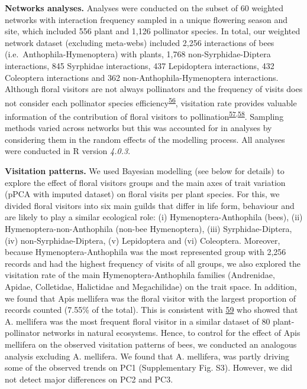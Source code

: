 \documentclass[12pt,a4paper,]{article}
\begin{document}
\textbf{Networks analyses.} Analyses were conducted on the subset of 60
weighted networks with interaction frequency sampled in a unique
flowering season and site, which included 556 plant and 1,126 pollinator
species. In total, our weighted network dataset (excluding meta-webs)
included 2,256 interactions of bees (i.e.~Anthophila-Hymenoptera) with
plants, 1,768 non-Syrphidae-Diptera interactions, 845 Syrphidae
interactions, 437 Lepidoptera interactions, 432 Coleoptera interactions
and 362 non-Anthophila-Hymenoptera interactions. Although floral
visitors are not always pollinators and the frequency of visits does not
consider each pollinator species
efficiency\textsuperscript{\protect\hyperlink{ref-ballantyne2015}{56}},
visitation rate provides valuable information of the contribution of
floral visitors to
pollination\textsuperscript{\protect\hyperlink{ref-vazquez2005}{57},\protect\hyperlink{ref-vazquez2012}{58}}.
Sampling methods varied across networks but this was accounted for in
analyses by considering them in the random effects of the modelling
process. All analyses were conducted in R version \emph{4.0.3}.

\textbf{Visitation patterns.} We used Bayesian modelling (see below for
details) to explore the effect of floral visitors groups and the main
axes of trait variation (pPCA with imputed dataset) on floral visits per
plant species. For this, we divided floral visitors into six main guilds
that differ in life form, behaviour and are likely to play a similar
ecological role: (i) Hymenoptera-Anthophila (bees), (ii)
Hymenoptera-non-Anthophila (non-bee Hymenoptera), (iii)
Syrphidae-Diptera, (iv) non-Syrphidae-Diptera, (v) Lepidoptera and (vi)
Coleoptera. Moreover, because Hymenoptera-Anthophila was the most
represented group with 2,256 records and had the highest frequency of
visits of all groups, we also explored the visitation rate of the main
Hymenoptera-Anthophila families (Andrenidae, Apidae, Colletidae,
Halictidae and Megachilidae) on the trait space. In addition, we found
that Apis mellifera was the floral visitor with the largest proportion
of records counted (7.55\% of the total). This is consistent with
\protect\hyperlink{ref-hung2018}{59} who showed that A. mellifera was
the most frequent floral visitor in a similar dataset of 80
plant-pollinator networks in natural ecosystems. Hence, to control for
the effect of Apis mellifera on the observed visitation patterns of
bees, we conducted an analogous analysis excluding A. mellifera. We
found that A. mellifera, was partly driving some of the observed trends
on PC1 (Supplementary Fig. S3). However, we did not detect major
differences on PC2 and PC3.
\end{document}

